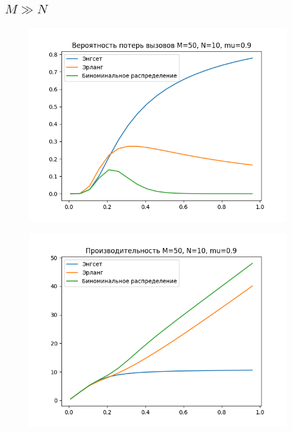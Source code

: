 \documentclass[12pt]{article}
\let\Oldsubsection\subsection
\renewcommand{\subsection}{\FloatBarrier\Oldsubsection}
\begin{document}
\subsection{$M ≫ N$}
\begin{figure}[!htb]
\centering
\includegraphics[scale=1.00]{assets/iss_1/loss_prob_M50_N10_mu09.png}
\caption{}
\label{}
\end{figure}

\begin{figure}[!htb]
\centering
\includegraphics[scale=1.00]{assets/iss_1/perf_M50_N10_mu09.png}
\caption{}
\label{}
\end{figure}
\end{document}
